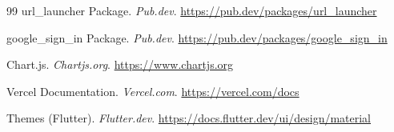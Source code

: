 \documentclass[12pt,a4paper]{report}
\begin{document}
\begin{thebibliography}{99}
url\_launcher Package. \textit{Pub.dev}.
\url{https://pub.dev/packages/url_launcher}

google\_sign\_in Package. \textit{Pub.dev}.
\url{https://pub.dev/packages/google_sign_in}

Chart.js. \textit{Chartjs.org}.
\url{https://www.chartjs.org}

Vercel Documentation. \textit{Vercel.com}.
\url{https://vercel.com/docs}

Themes (Flutter). \textit{Flutter.dev}.
\url{https://docs.flutter.dev/ui/design/material}

\end{thebibliography}
\end{document}
